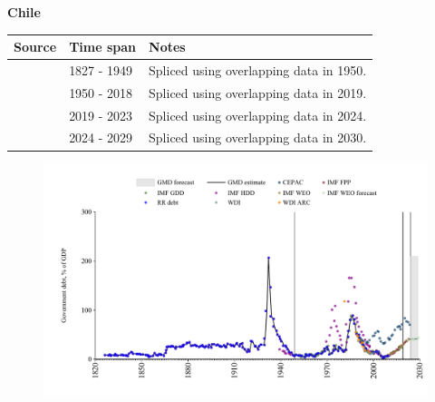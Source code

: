 \documentclass[12pt,a4paper,landscape]{article}
\begin{document}
\begin{adjustbox}{max totalsize={\paperwidth}{\paperheight},center}
\begin{minipage}[t][\textheight][t]{\textwidth}
\vspace*{0.5cm}
{}
\begin{center}
{\Large\bfseries Chile}
\end{center}
\vspace{0.5cm}
\begin{table}[H]
\centering
\small
\begin{tabular}{|l|l|l|}
\hline
\textbf{Source} & \textbf{Time span} & \textbf{Notes} \\
\hline
\rowcolor{white}\cite{IMF_FPP}& 1827 - 1949 &Spliced using overlapping data in 1950.\\
\rowcolor{lightgray}\cite{IMF_GDD}& 1950 - 2018 &Spliced using overlapping data in 2019.\\
\rowcolor{white}\cite{IMF_FPP}& 2019 - 2023 &Spliced using overlapping data in 2024.\\
\rowcolor{lightgray}\cite{IMF_WEO_forecast}& 2024 - 2029 &Spliced using overlapping data in 2030.\\
\hline
\end{tabular}
\end{table}
\begin{figure}[H]
\centering
\includegraphics[width=\textwidth,height=0.6\textheight,keepaspectratio]{graphs/CHL_govdebt_GDP.pdf}
\end{figure}
\end{minipage}
\end{adjustbox}
\end{document}

